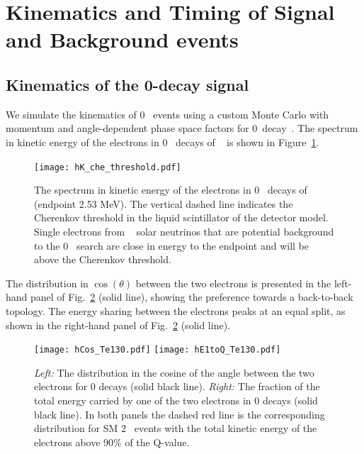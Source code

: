\section{Kinematics and Timing of Signal and Background events}
\label{sec:kinematics_and_timing}


\subsection{Kinematics of the 0\nbb-decay signal}

We simulate the kinematics of 0\nbb~ events using a custom Monte
Carlo with momentum and angle-dependent phase space
factors for 0\nbb~decay~\cite{Jenni}.  The spectrum in kinetic energy
of the electrons in 0\nbb~ decays of \Te~ is shown in
Figure~\ref{fig:Energy_spectrum}.

\begin{figure}[ht]
  \centering
  \texttt{[image: hK\_che\_threshold.pdf]}
  \caption{The spectrum in kinetic energy of the electrons in 0\nbb~
  decays of \Te~ (endpoint 2.53 MeV). The vertical dashed line
  indicates the Cherenkov threshold in the liquid scintillator of the
  detector model. Single electrons from \B~ solar neutrinos that are
  potential background to the 0\nbb~ search are close in energy to the
  endpoint and will be above the Cherenkov threshold.}
 \label{fig:Energy_spectrum}
\end{figure}


The distribution in
$\cos{(\theta)}$ between the two electrons is presented in the left-hand
panel of Fig.~\ref{fig:Kinematics} (solid line), showing the
preference towards a back-to-back topology.  The energy sharing between
the electrons peaks at an equal split, as shown in the right-hand
panel of Fig.~\ref{fig:Kinematics} (solid line).

\begin{figure}[ht]
  \centering
  \texttt{[image: hCos\_Te130.pdf]}
  \texttt{[image: hE1toQ\_Te130.pdf]}
  \caption{\emph{Left:} The distribution in the cosine of the angle
      between the two electrons for 0{\nbb} decays (solid black line).
      \emph{Right:} The fraction of the total energy carried by one of
      the two electrons in 0{\nbb} decays (solid black line).  In both
      panels the dashed red line is the corresponding distribution for
      SM 2\nbb~ events with the total kinetic energy of the electrons
      above 90\% of the Q-value.}
  \label{fig:Kinematics}
\end{figure}

